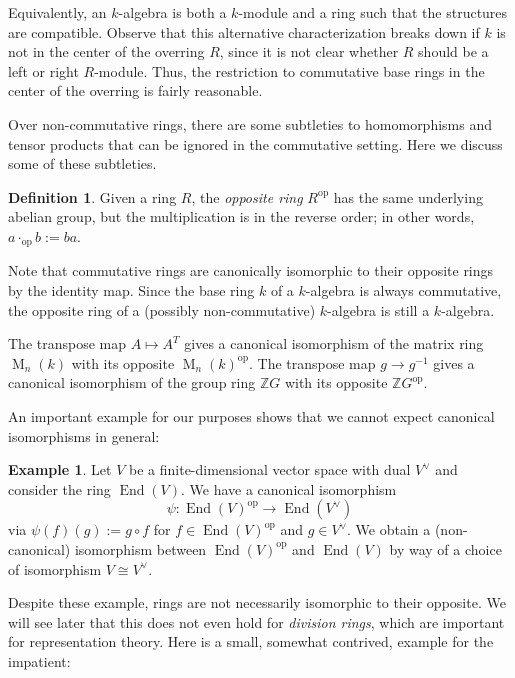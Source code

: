 \documentclass[12pt]{article}
\theoremstyle{plain}
\theoremstyle{definition}
\newtheorem{definition}[theorem]{Definition}
\newtheorem{example}[theorem]{Example}
\theoremstyle{remark}
\numberwithin{equation}{section}
\begin{document}
Equivalently, an $k$-algebra is both a $k$-module and a ring such
that the structures are compatible.
Observe that this alternative characterization breaks down if $k$ is not
in the center of the overring $R$, since it is not clear whether
$R$ should be a left or right $R$-module.
Thus, the restriction to commutative base rings in the center of the
overring is fairly reasonable.

Over non-commutative rings, there are some subtleties to homomorphisms
and tensor products that can be ignored in the commutative setting.
Here we discuss some of these subtleties.

\begin{definition}
Given a ring $R$, the \emph{opposite ring} $R^{\mathrm{op}}$ has
the same underlying abelian group, but the multiplication is in the
reverse order; in other words, $a \cdot_{\mathrm{op}} b := ba$.
\end{definition}

Note that commutative rings are canonically isomorphic to their
opposite rings by the identity map.
Since the base ring $k$ of a $k$-algebra is always commutative,
the opposite ring of a (possibly non-commutative)
$k$-algebra is still a $k$-algebra.

The transpose map $A \mapsto A^T$ gives a canonical isomorphism
of the matrix ring $\operatorname{M}_n(k)$ with its opposite
$\operatorname{M}_n(k)^{\mathrm{op}}$.
The transpose map $g \to g^{-1}$ gives a canonical isomorphism
of the group ring $\mathbb{Z}G$ with its opposite
$\mathbb{Z}G^{\mathrm{op}}$.

An important example for our purposes shows that we cannot expect
canonical isomorphisms in general:

\begin{example}
Let $V$ be a finite-dimensional vector space with dual $V^\vee$
and consider the ring $\operatorname{End}(V)$.
We have a canonical isomorphism
\[
\psi : \operatorname{End}(V)^{\mathrm{op}} \to \operatorname{End}(V^\vee)
\]
via $\psi(f)(g):=g \circ f$ for $f \in
\operatorname{End}(V)^{\mathrm{op}}$ and $g \in V^\vee$.
We obtain a (non-canonical) isomorphism between
$\operatorname{End}(V)^{\mathrm{op}}$ and $\operatorname{End}(V)$
by way of a choice of isomorphism $V \cong V^\vee$.
\end{example}

Despite these example, rings are not necessarily isomorphic to their opposite.
We will see later that this does not even hold for \emph{division
rings}, which are important for representation theory.
Here is a small, somewhat contrived, example for the impatient: 
\end{document}
